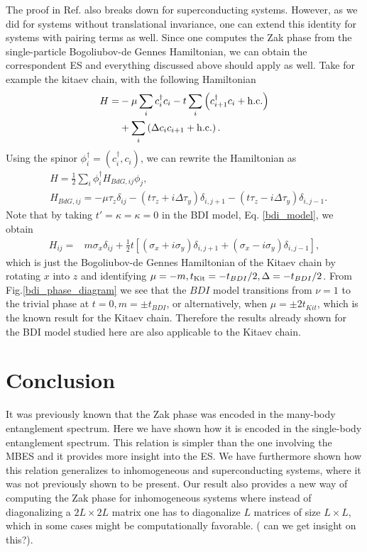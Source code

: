 \documentclass[twocolumn,amsmath,longbibliography,amssymb,superscriptaddress]{revtex4-1}
\newcommand{\carlos}[1]{{\color{red} #1}}
\begin{document}
The proof in Ref.\cite{Zaletel2014} also breaks down for superconducting systems. However, as we did for systems without translational invariance, one can extend this identity for systems with pairing terms as well. Since one computes the Zak phase from the single-particle Bogoliubov-de Gennes Hamiltonian, we can obtain the correspondent ES and everything discussed above should apply as well. Take for example the kitaev chain, with the following Hamiltonian
\begin{align*}
H =& -\mu \sum_{i} c_i^\dagger c_i - t \sum_{i}\left( c_{i+1}^\dagger c_i + {\rm h.c.}\right) \\
&+  \sum_{i}\left( \Delta c_{i} c_{i+1} + {\rm h.c.}\right).
\end{align*}
Using the spinor $\phi_i^\dagger = (c_i^\dagger, c_i)$, we can rewrite the Hamiltonian as
\begin{align*}
&H = \frac{1}{2}\sum_i \phi^\dagger_i H_{BdG,ij} \phi_j,\\
&H_{BdG,ij} = -\mu \tau_z \delta_{ij} - (t \tau_z + i\Delta \tau_y )\delta_{i,j+1}- (t \tau_z - i\Delta \tau_y)\delta_{i,j-1}.
\end{align*}
Note that by taking $t' = \kappa = \kappa = 0$ in the BDI model, Eq. \ref{bdi_model}, we obtain
\begin{align*}
H_{ij} =& m \sigma_x\delta_{ij} + \frac{1}{2} t \left[(\sigma_x + i \sigma_y)\delta_{i,j+1} + (\sigma_x - i \sigma_y) \delta_{i,j-1} \right],
\end{align*}
which is just the Bogoliubov-de Gennes Hamiltonian of the Kitaev chain by rotating $x$ into $z$ and identifying $\mu = -m, t_{\rm Kit} = -t_{BDI}/2, \Delta = -t_{BDI}/2 $. From Fig.\ref{bdi_phase_diagram} we see that the $BDI$ model transitions from $\nu = 1$ to the trivial phase at $t=0, m=\pm t_{BDI}$, or alternatively, when $\mu = \pm 2 t_{Kit}$, which is the known result for the Kitaev chain. Therefore the results already shown for the BDI model studied here are also applicable to the Kitaev chain.  

\section{Conclusion}

It was previously known that the Zak phase was encoded in the many-body entanglement spectrum. Here we have shown how it is encoded in the single-body entanglement spectrum. This relation is simpler than the one involving the MBES and it provides more insight into the ES. We have furthermore shown how this relation generalizes to inhomogeneous and superconducting systems, where it was not previously shown to be present. Our result also provides a new way of computing the Zak phase for inhomogeneous systems where instead of diagonalizing a $2L\times 2L$ matrix one has to diagonalize $L$ matrices of size $L\times L$, which in some cases might be computationally favorable. (\carlos{can we get insight on this?}). 
\end{document}
